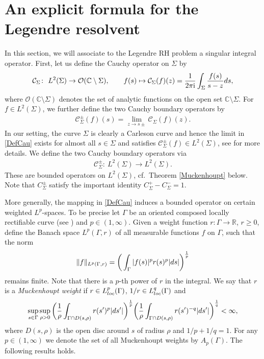 \documentclass[11pt]{article}
\numberwithin{equation}{section}
\newcommand{\R}{\mathbb{R}}
\newcommand{\C}{\mathbb{C}}
\newcommand{\Cau}{\mathcal C_{\Sigma}}
\newcommand{\Ltwo}{L^2(\Sigma)}
\newcommand{\I}{\mathrm{i}}
\numberwithin{equation}{section}
\begin{document}
\section{An explicit formula for the Legendre resolvent}\label{Section_LegendreResolvent}
In this section, we will associate to the Legendre RH problem a singular integral operator. First, let us define the Cauchy operator on $\Sigma$ by
\begin{align*}
 \Cau \colon\ L^2(\Sigma) \to \mathcal O(\C \setminus \Sigma), \qquad f(s) \mapsto \Cau(f)(z) = \frac{1}{2\pi \I }\int_\Sigma \frac{f(s)}{s-z} {\rm d}s,
\end{align*}
where $\mathcal O(\C \setminus \Sigma)$ denotes the set of analytic functions on the open set $\C \setminus \Sigma$. For $f \in L^2(\Sigma)$, we further define the two Cauchy boundary operators by
\begin{align}\label{DefCau}
 \Cau^\pm(f)(s) = \lim_{z\to s\pm} \Cau(f)(z).
\end{align}
In our setting, the curve $\Sigma$ is clearly a Carleson curve and hence the limit in \eqref{DefCau} exists for almost all $s \in \Sigma$
and satisfies $\Cau^\pm(f) \in L^2(\Sigma)$, see \cite{BK} for more details. We define the two Cauchy boundary operators via
\begin{align*}
\Cau^\pm \colon\ L^2(\Sigma) \to L^2(\Sigma).
\end{align*}
These are bounded operators on $\Ltwo$, cf.\ Theorem \ref{Muckenhoupt} below. Note that $C^\pm_{\Sigma}$ satisfy the important identity $C^+_\Sigma - C^-_\Sigma = 1$.

More generally, the mapping in \eqref{DefCau} induces a bounded operator on certain weighted $L^p$-spaces. To be precise let $\Gamma$ be an oriented composed locally rectifiable curve (see \cite[Section~1]{BK}) and $p \in (1,\infty)$. Given a weight function $r \colon \Gamma \to \R$, $r \geq 0$, define the Banach space $L^p(\Gamma, r)$ of all measurable functions $f$ on $\Gamma$, such that the norm
\begin{align*}
 \Vert f \Vert_{L^p(\Gamma, r)} = \bigg( \int_\Gamma |f(s)|^p r(s)^p |{\rm d}s| \bigg)^{\frac{1}{p}}
\end{align*}
remains finite. Note that there is a $p$-th power of $r$ in the integral. We say that $r$ is a \emph{Muckenhoupt weight} if $r \in L^p_{\rm loc}(\Gamma)$, $1/r \in L^q_{\rm loc}(\Gamma)$ and
\begin{align*}
 \sup_{s\in \Gamma} \sup_{\rho > 0} \bigg(\frac{1}{\rho} \int_{\Gamma \cap D(s, \rho)} r(s')^p |{\rm d}s'| \bigg)^{\frac{1}{p}}
 \bigg( \frac{1}{\rho}\int_{\Gamma \cap D(s, \rho)} r(s')^{-q}|{\rm d}s'| \bigg)^{\frac{1}{q}} < \infty,
\end{align*}
where $D(s, \rho)$ is the open disc around $s$ of radius $\rho$ and $1/p + 1/q = 1$. For any $p \in (1, \infty)$ we denote the set of all Muckenhoupt weights by $A_p(\Gamma)$. The following results holds.
\end{document}
